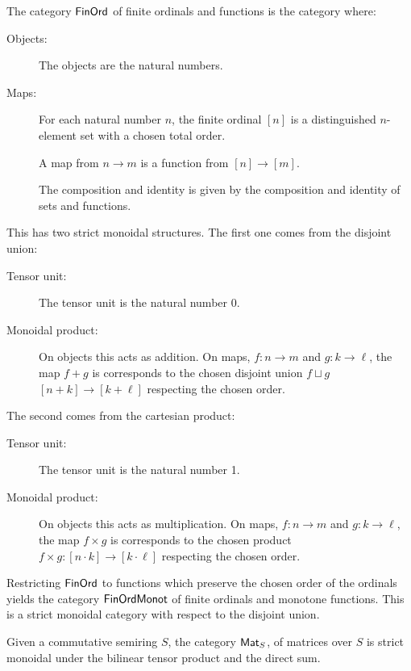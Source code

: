 \begin{example}

The category $\mathsf{FinOrd}$ of finite ordinals and functions is the category where:

\begin{description}
\item[Objects:] The objects are the natural numbers.

\item[Maps:]
For each natural number $n$, the finite ordinal $[n]$ is a distinguished $n$-element set with a chosen total order.


A map from $n\to m$ is a function from $[n]\to [m]$.

The composition and identity is given by the composition and identity of sets and functions.
\end{description}

This has two strict monoidal structures.  The first one comes from the disjoint union:

\begin{description}
\item[Tensor unit:] The tensor unit is the natural number 0.
\item[Monoidal product:]
On objects this acts as addition.  On maps, $f:n\to m$ and $g:k\to \ell$, the map $f+g$ is corresponds to the chosen disjoint union $f\sqcup g$ $[n+k]\to [k+\ell]$ respecting the chosen order.
\end{description}

The second comes from the cartesian product:

\begin{description}
\item[Tensor unit:] The tensor unit is the natural number 1.
\item[Monoidal product:]
On objects this acts as multiplication.  On maps, $f:n\to m$ and $g:k\to \ell$, the map $f\times g$ is corresponds to the chosen product $f\times g:[n\cdot k]\to [k\cdot \ell]$ respecting the chosen order.
\end{description}


Restricting $\mathsf{FinOrd}$ to functions which preserve the chosen order of the ordinals yields the category $\mathsf{FinOrdMonot}$ of finite ordinals and monotone functions.  This is a strict monoidal category with respect to the disjoint union.
\end{example}

\begin{example}
Given a commutative semiring $S$, the category $\mathsf{Mat}_S$, of matrices over $S$ is strict monoidal under the bilinear tensor product and the direct sum.
\end{example}






